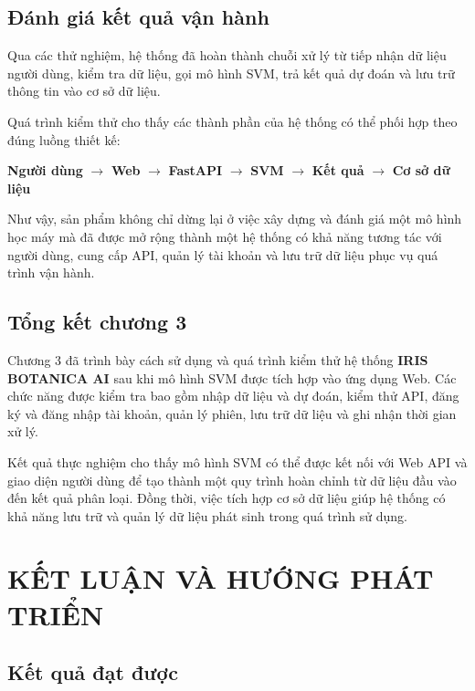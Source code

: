 \documentclass[14pt]{extarticle}
\begin{document}
	\subsection{Đánh giá kết quả vận hành}
	
	\noindent Qua các thử nghiệm, hệ thống đã hoàn thành chuỗi xử lý từ tiếp nhận dữ liệu người dùng, kiểm tra dữ liệu, gọi mô hình SVM, trả kết quả dự đoán và lưu trữ thông tin vào cơ sở dữ liệu.
	
	\noindent Quá trình kiểm thử cho thấy các thành phần của hệ thống có thể phối hợp theo đúng luồng thiết kế:
	
	\begin{center}
		\textbf{Người dùng}
		$\rightarrow$
		\textbf{Web}
		$\rightarrow$
		\textbf{FastAPI}
		$\rightarrow$
		\textbf{SVM}
		$\rightarrow$
		\textbf{Kết quả}
		$\rightarrow$
		\textbf{Cơ sở dữ liệu}
	\end{center}
	
	\noindent Như vậy, sản phẩm không chỉ dừng lại ở việc xây dựng và đánh giá một mô hình học máy mà đã được mở rộng thành một hệ thống có khả năng tương tác với người dùng, cung cấp API, quản lý tài khoản và lưu trữ dữ liệu phục vụ quá trình vận hành.
	
	\subsection{Tổng kết chương 3}
	
	\noindent Chương 3 đã trình bày cách sử dụng và quá trình kiểm thử hệ thống \textbf{IRIS BOTANICA AI} sau khi mô hình SVM được tích hợp vào ứng dụng Web. Các chức năng được kiểm tra bao gồm nhập dữ liệu và dự đoán, kiểm thử API, đăng ký và đăng nhập tài khoản, quản lý phiên, lưu trữ dữ liệu và ghi nhận thời gian xử lý.
	
	\noindent Kết quả thực nghiệm cho thấy mô hình SVM có thể được kết nối với Web API và giao diện người dùng để tạo thành một quy trình hoàn chỉnh từ dữ liệu đầu vào đến kết quả phân loại. Đồng thời, việc tích hợp cơ sở dữ liệu giúp hệ thống có khả năng lưu trữ và quản lý dữ liệu phát sinh trong quá trình sử dụng.
	\newpage 
	\section{KẾT LUẬN VÀ HƯỚNG PHÁT TRIỂN}
	
	\subsection{Kết quả đạt được}
	
\end{document}
